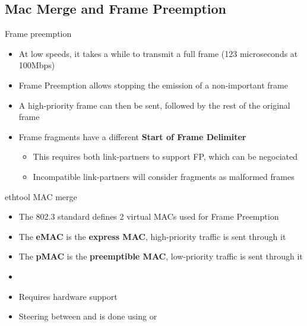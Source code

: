 \subsection{Mac Merge and Frame Preemption}

\begin{frame}{Frame preemption}
	\begin{itemize}
		\item At low speeds, it takes a while to transmit a full frame (123 microseconds at 100Mbps)
		\item Frame Preemption allows stopping the emission of a non-important frame
		\item A high-priority frame can then be sent, followed by the rest of the original frame
		\item Frame fragments have a different \textbf{Start of Frame Delimiter}
			\begin{itemize}
				\item This requires both link-partners to support FP, which can be negociated
				\item Incompatible link-partners will consider fragments as malformed frames
			\end{itemize}
	\end{itemize}
\end{frame}

\begin{frame}{ethtool MAC merge}
	\begin{itemize}
		\item The 802.3 standard defines 2 virtual MACs used for Frame Preemption
		\item The \textbf{eMAC} is the \textbf{express MAC}, high-priority traffic is sent through it
		\item The \textbf{pMAC} is the \textbf{preemptible MAC}, low-priority traffic is sent through it
		\item {}
		\item Requires hardware support
		\item Steering between  and  is done using  or 
	\end{itemize}
\end{frame}

